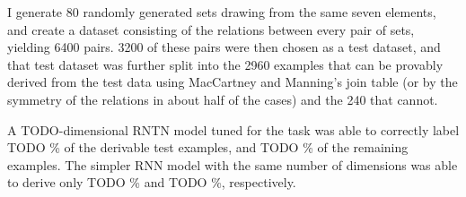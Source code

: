 I generate 80 randomly generated sets drawing from the same seven elements, and create a dataset consisting of the relations between every pair of sets, yielding 6400 pairs. 3200 of these pairs were then chosen as a test dataset, and that test dataset was further split into the 2960 examples that can be provably derived from the test data using MacCartney and Manning's join table (or by the symmetry of the relations in about half of the cases) and the 240 that cannot. %

 A TODO-dimensional RNTN model tuned for the task was able to correctly label TODO \% of the derivable test examples, and TODO \% of the remaining examples. The simpler RNN model with the same number of dimensions was able to derive only TODO \% and TODO \%, respectively.
